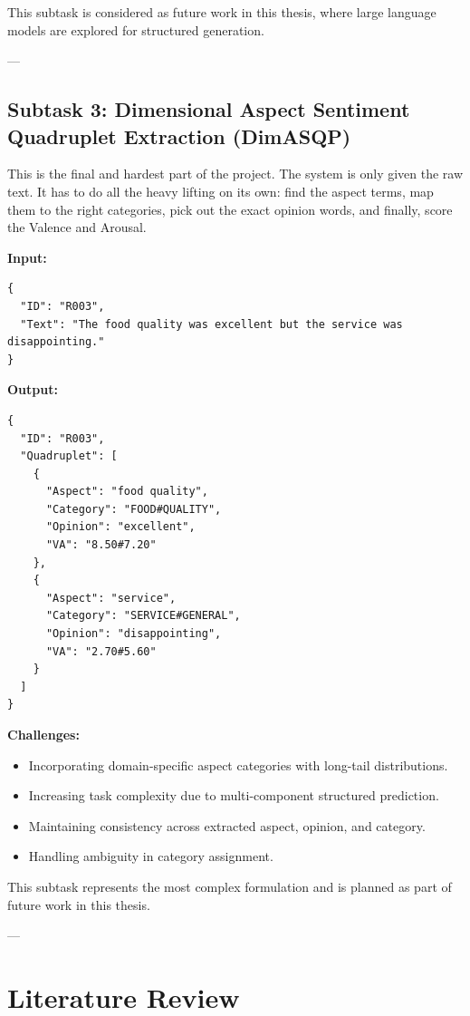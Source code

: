 \documentclass{article}
\begin{document}
This subtask is considered as future work in this thesis, where large language models are explored for structured generation.

---

\subsection{Subtask 3: Dimensional Aspect Sentiment Quadruplet Extraction (DimASQP)}

This is the final and hardest part of the project. The system is only given the raw text. It has to do all the heavy lifting on its own: find the aspect terms, map them to the right categories, pick out the exact opinion words, and finally, score the Valence and Arousal. 

\textbf{Input:}
\begin{verbatim}
{
  "ID": "R003",
  "Text": "The food quality was excellent but the service was disappointing."
}
\end{verbatim}

\textbf{Output:}
\begin{verbatim}
{
  "ID": "R003",
  "Quadruplet": [
    {
      "Aspect": "food quality",
      "Category": "FOOD#QUALITY",
      "Opinion": "excellent",
      "VA": "8.50#7.20"
    },
    {
      "Aspect": "service",
      "Category": "SERVICE#GENERAL",
      "Opinion": "disappointing",
      "VA": "2.70#5.60"
    }
  ]
}
\end{verbatim}

\textbf{Challenges:}
\begin{itemize}
    \item Incorporating domain-specific aspect categories with long-tail distributions.
    \item Increasing task complexity due to multi-component structured prediction.
    \item Maintaining consistency across extracted aspect, opinion, and category.
    \item Handling ambiguity in category assignment.
\end{itemize}

This subtask represents the most complex formulation and is planned as part of future work in this thesis.

---


\section{Literature Review}
\label{sec:literature}
\end{document}
